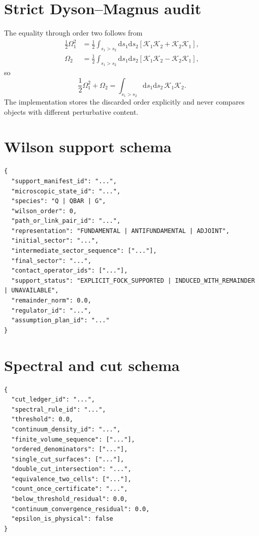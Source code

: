 \documentclass[11pt]{article}
\newcommand{\dd}{\mathrm{d}}
\newcommand{\cK}{\mathcal K}
\begin{document}
\section{Strict Dyson--Magnus audit}
\label{app:dyson-magnus}

The equality through order two follows from
\begin{align}
 \frac12\Omega_1^2
 &=\frac12\int_{s_1>s_2}\dd s_1\dd s_2
 \left[
 \cK_1\cK_2+\cK_2\cK_1
 \right],\\
 \Omega_2
 &=\frac12\int_{s_1>s_2}\dd s_1\dd s_2
 \left[
 \cK_1\cK_2-\cK_2\cK_1
 \right],
\end{align}
so
\begin{equation}
 \frac12\Omega_1^2+\Omega_2
 =\int_{s_1>s_2}\dd s_1\dd s_2\,\cK_1\cK_2.
\end{equation}
The implementation stores the discarded order explicitly and never compares
objects with different perturbative content.

\section{Wilson support schema}
\label{app:support-schema}

\begin{verbatim}
{
  "support_manifest_id": "...",
  "microscopic_state_id": "...",
  "species": "Q | QBAR | G",
  "wilson_order": 0,
  "path_or_link_pair_id": "...",
  "representation": "FUNDAMENTAL | ANTIFUNDAMENTAL | ADJOINT",
  "initial_sector": "...",
  "intermediate_sector_sequence": ["..."],
  "final_sector": "...",
  "contact_operator_ids": ["..."],
  "support_status": "EXPLICIT_FOCK_SUPPORTED | INDUCED_WITH_REMAINDER | UNAVAILABLE",
  "remainder_norm": 0.0,
  "regulator_id": "...",
  "assumption_plan_id": "..."
}
\end{verbatim}

\section{Spectral and cut schema}
\label{app:cut-schema}

\begin{verbatim}
{
  "cut_ledger_id": "...",
  "spectral_rule_id": "...",
  "threshold": 0.0,
  "continuum_density_id": "...",
  "finite_volume_sequence": ["..."],
  "ordered_denominators": ["..."],
  "single_cut_surfaces": ["..."],
  "double_cut_intersection": "...",
  "equivalence_two_cells": ["..."],
  "count_once_certificate": "...",
  "below_threshold_residual": 0.0,
  "continuum_convergence_residual": 0.0,
  "epsilon_is_physical": false
}
\end{verbatim}
\end{document}
